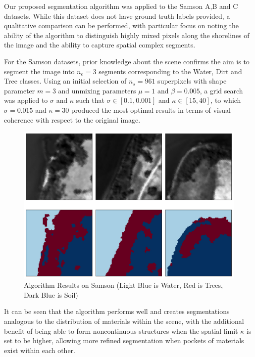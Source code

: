 Our proposed segmentation algorithm was applied to the Samson A,B and C datasets. While this dataset does not have ground truth labels provided, a qualitative comparison can be performed, with particular focus on noting the ability of the algorithm to distinguish highly mixed pixels along the shorelines of the image and the ability to capture spatial complex segments.

For the Samson datasets, prior knowledge about the scene confirms the aim is to segment the image into $n_e = 3$ segments corresponding to the Water, Dirt and Tree classes. Using an initial selection of $n_s = 961$ superpixels with shape parameter $m=3$ and unmixing parameters $\mu = 1$ and $\beta = 0.005$, a grid search was applied to $\sigma$ and $\kappa$ such that $\sigma \in [0.1, 0.001]$ and $\kappa \in [15, 40]$, to which $\sigma = 0.015$ and $\kappa = 30$ produced the most optimal results in terms of visual coherence with respect to the original image. 
\begin{figure}[H]
    \centering
    \includegraphics[width=15cm]{samsonabc-results.png}  %
    \caption{Algorithm Results on Samson (Light Blue is Water, Red is Trees, Dark Blue is Soil)}
    \label{samson-abc-results}  %
  \end{figure}
It can be seen that the algorithm performs well and creates segmentations analogous to the distribution of materials within the scene, with the additional benefit of being able to form noncontinuous structures when the spatial limit $\kappa$ is set to be higher, allowing more refined segmentation when pockets of materials exist within each other. 





